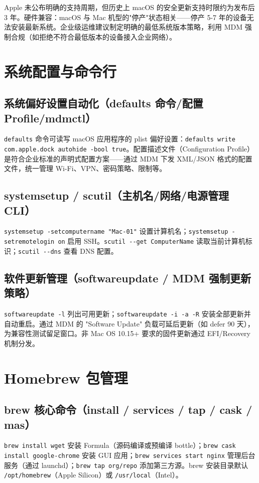 \documentclass[12pt,UTF8]{ctexbook}
\begin{document}
Apple 未公布明确的支持周期，但历史上 macOS 的安全更新支持时限约为发布后 3 年。硬件兼容：macOS 与 Mac 机型的"停产"状态相关——停产 5-7 年的设备无法安装最新系统。企业级运维建议制定明确的最低系统版本策略，利用 MDM 强制合规（如拒绝不符合最低版本的设备接入企业网络）。

  \section{系统配置与命令行}
    \subsection{系统偏好设置自动化（defaults 命令/配置 Profile/mdmctl）}

\verb|defaults| 命令可读写 macOS 应用程序的 plist 偏好设置：\verb|defaults write com.apple.dock autohide -bool true|。配置描述文件（Configuration Profile）是符合企业标准的声明式配置方案——通过 MDM 下发 XML/JSON 格式的配置文件，统一管理 Wi-Fi、VPN、密码策略、限制等。

    \subsection{systemsetup / scutil（主机名/网络/电源管理 CLI）}

\verb|systemsetup -setcomputername "Mac-01"| 设置计算机名；\verb|systemsetup -setremotelogin on| 启用 SSH。\verb|scutil --get ComputerName| 读取当前计算机标识；\verb|scutil --dns| 查看 DNS 配置。

    \subsection{软件更新管理（softwareupdate / MDM 强制更新策略）}

\verb|softwareupdate -l| 列出可用更新；\verb|softwareupdate -i -a -R| 安装全部更新并自动重启。通过 MDM 的 "Software Update" 负载可延后更新（如 defer 90 天），为兼容性测试留足窗口。非 Mac OS 10.15+ 要求的固件更新通过 EFI/Recovery 机制分发。

  \section{Homebrew 包管理}
    \subsection{brew 核心命令（install / services / tap / cask / mas）}

\verb|brew install wget| 安装 Formula（源码编译或预编译 bottle）；\verb|brew cask install google-chrome| 安装 GUI 应用；\verb|brew services start nginx| 管理后台服务（通过 launchd）；\verb|brew tap org/repo| 添加第三方源。brew 安装目录默认 \verb|/opt/homebrew|（Apple Silicon）或 \verb|/usr/local|（Intel）。
\end{document}
